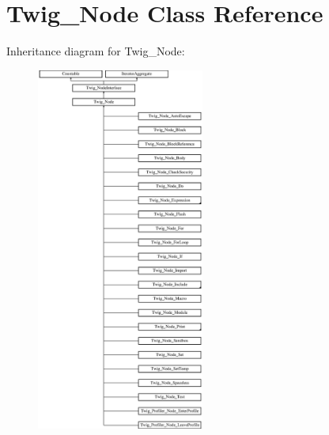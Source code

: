 \hypertarget{classTwig__Node}{}\section{Twig\+\_\+\+Node Class Reference}
\label{classTwig__Node}
Inheritance diagram for Twig\+\_\+\+Node\+:\begin{figure}[H]
\begin{center}
\leavevmode
\includegraphics[height=12.000000cm]{classTwig__Node}
\end{center}
\end{figure}
